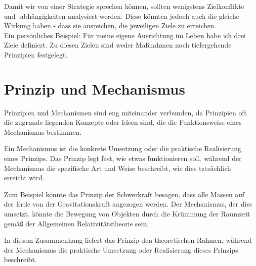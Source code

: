 Damit wir von einer Strategie sprechen können, sollten wenigstens Zielkonflikte und -abhängigkeiten analysiert werden. Diese könnten jedoch auch die gleiche Wirkung haben - dass sie ausreichen, die jeweiligen Ziele zu erreichen.\\

Ein persönliches Beispiel: Für meine eigene Ausrichtung im Leben habe ich drei Ziele definiert. Zu diesen Zielen sind weder Maßnahmen noch tiefergehende Prinzipien festgelegt.

\section{Prinzip und Mechanismus}\label{Appendix_Erlaeuterung_Prinzip}

Prinzipien und Mechanismen sind eng miteinander verbunden, da Prinzipien oft die zugrunde liegenden Konzepte oder Ideen sind, die die Funktionsweise eines Mechanismus bestimmen.

Ein Mechanismus ist die konkrete Umsetzung oder die praktische Realisierung eines Prinzips. Das Prinzip legt fest, wie etwas funktionieren soll, während der Mechanismus die spezifische Art und Weise beschreibt, wie dies tatsächlich erreicht wird.

Zum Beispiel könnte das Prinzip der Schwerkraft besagen, dass alle Massen auf der Erde von der Gravitationskraft angezogen werden. Der Mechanismus, der dies umsetzt, könnte die Bewegung von Objekten durch die Krümmung der Raumzeit gemäß der Allgemeinen Relativitätstheorie sein.

In diesem Zusammenhang liefert das Prinzip den theoretischen Rahmen, während der Mechanismus die praktische Umsetzung oder Realisierung dieses Prinzips beschreibt.
